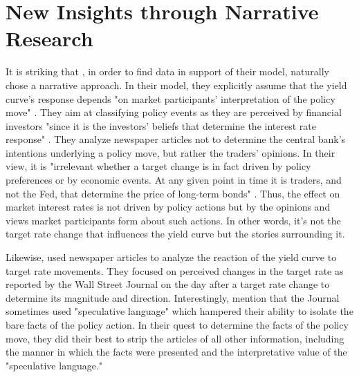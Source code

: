 \documentclass[11pt,a4paper,english,oneside]{book}
\numberwithin{equation}{chapter}
\begin{document}
%
%

%
%
%
%
%

\section{New Insights through Narrative Research} \label{NewInsights}

It is striking that \cite{Ellingsen.2003}, in order to find data in support of their model, naturally chose a narrative approach. In their model, they explicitly assume that the yield curve's response depends "on market participants’ interpretation of the policy move" \citep[~p. 1603]{Ellingsen.2001}. They aim at classifying policy events as they are perceived by financial investors "since it is the investors’ beliefs that determine the interest rate response" \citep[~p. 1604]{Ellingsen.2001}. They analyze newspaper articles not to determine the central bank's intentions underlying a policy move, but rather the traders' opinions. In their view, it is "irrelevant whether a target change is in fact driven by policy preferences or by economic events. At any given point in time it is traders, and not the Fed, that determine the price of long-term bonds" \cite[~p. 2]{Ellingsen.2003}. Thus, the effect on market interest rates is not driven by policy actions but by the opinions and views market participants form about such actions. In other words, it's not the target rate change that influences the yield curve but the stories surrounding it.

Likewise, \cite{Cook.1989} used newspaper articles to analyze the reaction of the yield curve to target rate movements. They focused on perceived changes in the target rate as reported by the Wall Street Journal on the day after a target rate change to determine its magnitude and direction. Interestingly, \citet[~p. 337]{Cook.1989} mention that the Journal sometimes used "speculative language" which hampered their ability to isolate the bare facts of the policy action. In their quest to determine the facts of the policy move, they did their best to strip the articles of all other information, including the manner in which the facts were presented and the interpretative value of the "speculative language." 
\end{document}
